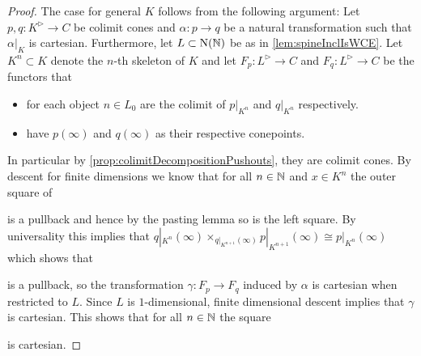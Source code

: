 \begin{lemma}
\begin{proof}
        The case for general $K$ follows from the following argument:
        Let $p,q\colon K^{\rhd}\to C$  be colimit cones and $\alpha\colon p\to q$ be a natural transformation such that $\alpha|_K$ is cartesian.
        Furthermore, let $L\subset\operatorname{N}(\mathbb{N})$ be as in \cref{lem:spineInclIsWCE}.
        Let $K^n\subset K$ denote the $n$-th skeleton of $K$ and let $F_p\colon L^{\rhd}\to C$ and $F_q\colon L^{\rhd}\to C$ be the functors that 
        \begin{itemize}
            \item for each object $n\in L_0$ are the colimit of $p|_{K^n}$ and $q|_{K^n}$ respectively.
            \item have $p(\infty)$ and $q(\infty)$ as their respective conepoints.
        \end{itemize}
        In particular by \cref{prop:colimitDecompositionPushouts}, they are colimit cones.
        By descent for finite dimensions we know that for all $n\in\mathbb{N}$ and $x\in K^n$ the outer square of
        \begin{center}
        \end{center}
        is a pullback and hence by the pasting lemma so is the left square.
        By universality this implies that $q|_{K^n}(\infty)\times_{q|_{K^{n+1}}(\infty)}p|_{K^{n+1}}(\infty)\cong p|_{K^n}(\infty)$ which shows that
        \begin{center}
        \end{center}
        is a pullback, so the transformation $\gamma\colon F_p\to F_q$ induced by $\alpha$ is cartesian when restricted to $L$.
        Since $L$ is $1$-dimensional, finite dimensional descent implies that $\gamma$ is cartesian.
        This shows that for all $n\in\mathbb{N}$ the square
        \begin{center}
        \end{center}
        is cartesian.


\end{proof}
\end{lemma}
